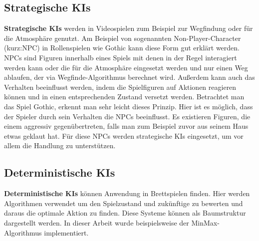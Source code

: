 \subsection{Strategische KIs}
\label{ch:Grundlagen:sec:strategisch}
\textbf{Strategische KIs} werden in Videospielen zum Beispiel zur Wegfindung oder für die Atmosphäre genutzt. Am Beispiel von sogenannten Non-Player-Character (kurz:NPC) in Rollenspielen wie Gothic kann diese Form  gut erklärt werden. NPCs sind Figuren innerhalb eines Spiels mit denen in der Regel interagiert werden kann oder die für die Atmosphäre eingesetzt werden und nur einen Weg ablaufen, der via Wegfinde-Algorithmus berechnet wird. Außerdem kann auch das Verhalten beeinflusst werden, indem die Spielfiguren auf Aktionen reagieren können und in einen entsprechenden Zustand versetzt werden. Betrachtet man das Spiel Gothic, erkennt man sehr leicht dieses Prinzip. Hier ist es möglich, dass der Spieler durch sein Verhalten die NPCs beeinflusst. Es existieren Figuren, die einem aggressiv gegenübertreten, falls man zum Beispiel zuvor aus seinem Haus etwas geklaut hat. Für diese NPCs werden strategische KIs eingesetzt, um vor allem die Handlung zu unterstützen.

\subsection{Deterministische KIs}
\label{ch:Grundlagen:sec:deterministisch}
\textbf{Deterministische KIs} können Anwendung in Brettspielen finden. Hier werden Algorithmen verwendet um den Spielzustand und zukünftige zu bewerten und daraus die optimale Aktion zu finden. Diese Systeme können als Baumstruktur dargestellt werden. In dieser Arbeit wurde beispielsweise der MinMax-Algorithmus implementiert.

